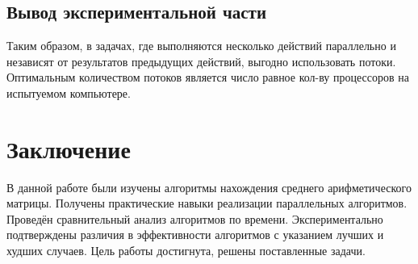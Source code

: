 \section{Вывод экспериментальной части}\label{experimentresult}

Таким образом, в задачах, где выполняются несколько действий параллельно и независят от результатов 
предыдущих действий, выгодно использовать потоки. Оптимальным количеством потоков является число равное кол-ву 
процессоров на испытуемом компьютере.

\chapter*{Заключение}\label{exit}

В данной работе были изучены алгоритмы нахождения среднего арифметического матрицы. 
Получены практические навыки реализации параллельных алгоритмов. 
Проведён сравнительный анализ алгоритмов по времени. 
Экспериментально подтверждены различия в эффективности алгоритмов с указанием лучших и худших случаев. 
Цель работы достигнута, решены поставленные задачи. 
